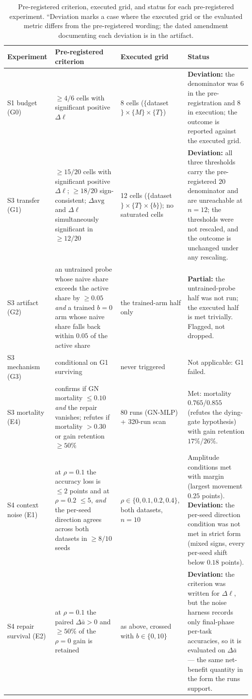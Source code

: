 \documentclass[10pt]{article}
\begin{document}
\begin{table}[h]
\centering\small
\caption{Pre-registered criterion, executed grid, and status for each pre-registered experiment. ``Deviation marks a case where the executed grid or the evaluated metric differs from the pre-registered wording; the dated amendment documenting each deviation is in the artifact.}
\label{tab:sup-prereg}
\begin{tabular}{p{}p{}p{}p{}}
\toprule
Experiment & Pre-registered criterion & Executed grid & Status \\
\midrule
S1 budget (G0) & $\ge 4/6$ cells with significant positive $\Delta\ell$ & 8 cells ($\{$dataset$\}\times\{M\}\times\{T\}$) & \textbf{Deviation:} the denominator was $6$ in the pre-registration and $8$ in execution; the outcome is reported against the executed grid. \\
S3 transfer (G1) & $\ge 15/20$ cells with significant positive $\Delta\ell$; $\ge 18/20$ sign-consistent; $\Delta\mathrm{avg}$ and $\Delta\ell$ simultaneously significant in $\ge 12/20$ & 12 cells ($\{$dataset$\}\times\{T\}\times\{b\}$); no saturated cells & \textbf{Deviation:} all three thresholds carry the pre-registered $20$ denominator and are unreachable at $n=12$; the thresholds were not rescaled, and the outcome is unchanged under any rescaling. \\
S3 artifact (G2) & an untrained probe whose naive share exceeds the active share by $\ge 0.05$ \emph{and} a trained $b=0$ arm whose naive share falls back within $0.05$ of the active share & the trained-arm half only & \textbf{Partial:} the untrained-probe half was not run; the executed half is met trivially. Flagged, not dropped. \\
S3 mechanism (G3) & conditional on G1 surviving & never triggered & Not applicable: G1 failed. \\
S3 mortality (E4) & confirms if GN mortality $\le 0.10$ \emph{and} the repair vanishes; refutes if mortality $> 0.30$ or gain retention $\ge 50\%$ & 80 runs (GN-MLP) + 320-run scan & Met: mortality $0.765$/$0.855$ (refutes the dying-gate hypothesis) with gain retention $17\%$/$26\%$. \\
S4 context noise (E1) & at $\rho=0.1$ the accuracy loss is $\le 2$ points and at $\rho=0.2$ $\le 5$, \emph{and} the per-seed direction agrees across both datasets in $\ge 8/10$ seeds & $\rho\in\{0,0.1,0.2,0.4\}$, both datasets, $n=10$ & Amplitude conditions met with margin (largest movement $0.25$ points). \textbf{Deviation:} the per-seed direction condition was not met in strict form (mixed signs, every per-seed shift below $0.18$ points). \\
S4 repair survival (E2) & at $\rho=0.1$ the paired $\Delta\bar a>0$ and $\ge 50\%$ of the $\rho=0$ gain is retained & as above, crossed with $b\in\{0,10\}$ & \textbf{Deviation:} the criterion was written for $\Delta\ell$, but the noise harness records only final-phase per-task accuracies, so it is evaluated on $\Delta\bar a$ --- the same net-benefit quantity in the form the runs support. \\
\bottomrule
\end{tabular}
\end{table}
\end{document}
